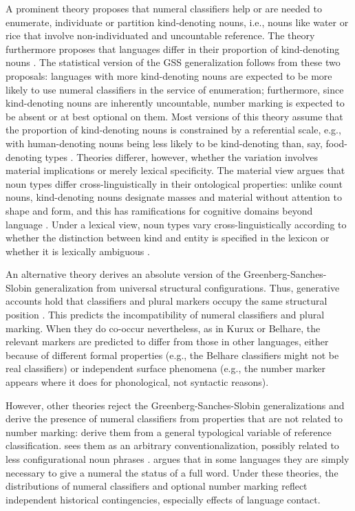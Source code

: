 \documentclass[11pt]{article}
\begin{document}
A prominent theory proposes that numeral classifiers help or are needed to enumerate, individuate or partition kind-denoting nouns, i.e., nouns like {\sc water} or {\sc rice} that involve non-individuated and uncountable reference.
The theory furthermore proposes that languages differ in their proportion of kind-denoting nouns \citep{Quine1960,Silverstein1976,Lucy1992, Croft1994,Krifka1995}. 
The statistical version of the GSS generalization follows from these two proposals: languages with more kind-denoting nouns are expected to be more likely to use numeral classifiers in the service of enumeration; furthermore, since kind-denoting nouns are inherently uncountable, number marking is expected to be absent or at best optional on them. 
Most versions of this theory assume that the proportion of kind-denoting nouns is constrained by a referential scale, e.g., with human-denoting nouns being less likely to be kind-denoting than, say, food-denoting types \citep{Lucy1992}. Theories differer, however, whether the variation involves material implications or merely lexical specificity. The material view argues that noun types differ cross-linguistically in their ontological properties: unlike count nouns, kind-denoting nouns designate masses and material without attention to shape and form, and this has ramifications for cognitive domains beyond language \citep{Cassirer1923,Lucy1992,ImaiGentner1997}. Under a lexical view, noun types vary cross-linguistically according to whether the distinction between kind and entity is specified in the lexicon or whether it is lexically ambiguous \citep{Bisang2002,Bisang2017}.

An alternative theory derives an absolute version of the Greenberg-Sanches-Slobin generalization from universal structural configurations. Thus, generative accounts hold that classifiers and plural markers occupy the same structural position \citep{Borer2005}. This predicts the incompatibility of numeral classifiers and plural marking. When they do co-occur nevertheless, as in Kurux or Belhare, the relevant markers are predicted to differ from those in other languages, either because of different formal properties (e.g., the Belhare classifiers might not be real classifiers) or independent surface phenomena (e.g., the number marker appears where it does for phonological, not syntactic reasons).

However, other theories reject the Greenberg-Sanches-Slobin generalizations and derive the presence of numeral classifiers from properties that are not related to number marking:
\citet{AikhenvaldDixon1998} derive them from a general typological variable of reference classification. 
\citet{Gil2005} sees them as an arbitrary conventionalization, possibly related to less configurational noun phrases \citep{Gil1987}. 
\citet{Lehmann2010} argues that in some languages they are simply necessary to give a numeral the status of a full word. Under these theories, the distributions of numeral classifiers and optional number marking reflect independent historical contingencies, especially effects of language contact.
\end{document}

